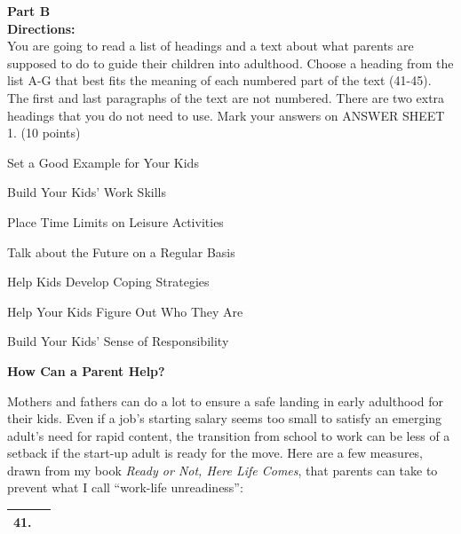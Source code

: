\newpage

\noindent
\textbf{Part B}\\
\textbf{Directions:}\\
You are going to read a list of headings and a text about what
parents are supposed to do to guide their children into adulthood.
Choose a heading from the list A-G that best fits the meaning of each
numbered part of the text (41-45). The first and last paragraphs of the
text are not numbered. There are two extra headings that you do not need
to use. Mark your answers on ANSWER SHEET 1. (10 points)


\TiGanSpace


\begin{listmatch}
\item 
Set a Good Example for Your Kids


\item 
Build Your Kids' Work Skills


\item 
Place Time Limits on Leisure Activities


\item 
Talk about the Future on a Regular Basis


\item 
Help Kids Develop Coping Strategies


\item 
Help Your Kids Figure Out Who They Are


\item 
 Build Your Kids' Sense of Responsibility
\end{listmatch}



\begin{center}
\textbf{How Can a Parent Help?}
\end{center}


Mothers and fathers can do a lot to ensure a safe landing in early
adulthood for their kids. Even if a job's starting salary seems too
small to satisfy an emerging adult's need for rapid content, the
transition from school to work can be less of a setback if the start-up
adult is ready for the move. Here are a few measures, drawn from my
book \emph{Ready or Not, Here Life Comes}, that parents can take to
prevent what I call ``work-life unreadiness'':


 \begin{tabular}{|c|c|}
 \hline 
41.  &   \hspace{10em}  \\ 
 \hline 
 \end{tabular}



